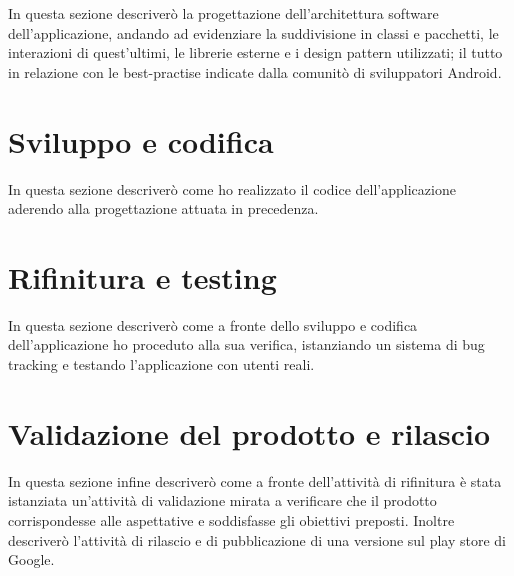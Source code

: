 In questa sezione descriverò la progettazione dell'architettura software dell'applicazione, andando ad evidenziare la suddivisione in classi e pacchetti, le interazioni di quest'ultimi, le librerie esterne e i design pattern utilizzati; il tutto in relazione con le best-practise indicate dalla comunitò di sviluppatori Android.

\section{Sviluppo e codifica}

In questa sezione descriverò come ho realizzato il codice dell'applicazione aderendo alla progettazione attuata in precedenza.

\section{Rifinitura e testing}

In questa sezione descriverò come a fronte dello sviluppo e codifica dell'applicazione ho proceduto alla sua verifica, istanziando un sistema di bug tracking e testando l'applicazione con utenti reali.

\section{Validazione del prodotto e rilascio}

In questa sezione infine descriverò come a fronte dell'attività di rifinitura è stata istanziata un'attività di validazione mirata a verificare che il prodotto corrispondesse alle aspettative e soddisfasse gli obiettivi preposti. Inoltre descriverò l'attività di rilascio e di pubblicazione di una versione sul play store di Google.